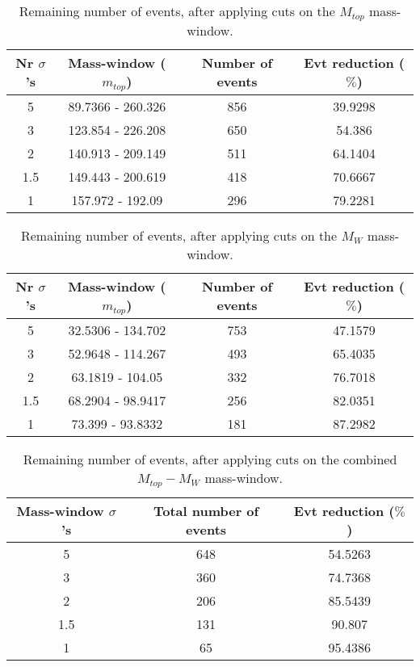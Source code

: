 \documentclass{article}
\begin{document}
 \begin{table}[h!t] 
  \caption{Remaining number of events, after applying cuts on the $M_{top}$ mass-window.} 
  \centering 
   \begin{tabular}{c|c|c|c|}
     Nr $\sigma$'s & Mass-window ($m_{top}$)   & Number of events   & Evt reduction ($\%$)     \\
     \hline
     5 & 89.7366 - 260.326  &   856 &  39.9298 \\ 
     3 & 123.854 - 226.208  &   650 &  54.386 \\ 
     2 & 140.913 - 209.149  &   511 &  64.1404 \\ 
     1.5 & 149.443 - 200.619  &   418 &  70.6667 \\ 
     1 & 157.972 - 192.09  &   296 &  79.2281 \\ 
   \end{tabular} 
 \end{table} 
 
 \begin{table}[h!t] 
  \caption{Remaining number of events, after applying cuts on the $M_{W}$ mass-window.} 
  \centering 
   \begin{tabular}{c|c|c|c|}
     Nr $\sigma$'s & Mass-window ($m_{top}$)    & Number of events   & Evt reduction ($\%$)    \\
     \hline
     5 & 32.5306 - 134.702  &   753 & 47.1579 \\ 
     3 & 52.9648 - 114.267  &   493 & 65.4035 \\ 
     2 & 63.1819 - 104.05  &   332 & 76.7018 \\ 
     1.5 & 68.2904 - 98.9417  &   256 & 82.0351 \\ 
     1 & 73.399 - 93.8332  &   181 & 87.2982 \\ 
   \end{tabular} 
 \end{table} 
 
 \begin{table}[h!t] 
  \caption{Remaining number of events, after applying cuts on the combined $M_{top}-M_{W}$ mass-window.} 
  \centering 
   \begin{tabular}{c|c|c|} 
     Mass-window $\sigma$'s & Total number of events    & Evt reduction ($\%$)     \\ 
     \hline
     5 & 648 & 54.5263 \\ 
     3 & 360 & 74.7368 \\ 
     2 & 206 & 85.5439 \\ 
     1.5 & 131 & 90.807 \\ 
     1 & 65 & 95.4386 \\ 
   \end{tabular} 
 \end{table} 
 
\end{document}
